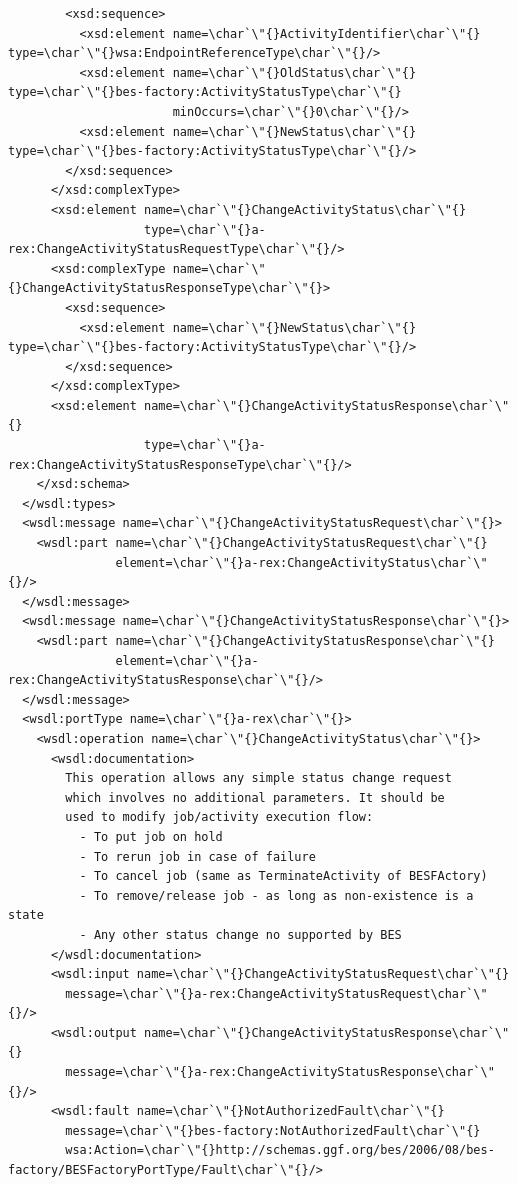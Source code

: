 \documentclass{article}                            %
\begin{document}
\begin{footnotesize}
\begin{verbatim}
        <xsd:sequence>
          <xsd:element name=\char`\"{}ActivityIdentifier\char`\"{} type=\char`\"{}wsa:EndpointReferenceType\char`\"{}/>
          <xsd:element name=\char`\"{}OldStatus\char`\"{} type=\char`\"{}bes-factory:ActivityStatusType\char`\"{}
                       minOccurs=\char`\"{}0\char`\"{}/>
          <xsd:element name=\char`\"{}NewStatus\char`\"{} type=\char`\"{}bes-factory:ActivityStatusType\char`\"{}/>
        </xsd:sequence>
      </xsd:complexType>
      <xsd:element name=\char`\"{}ChangeActivityStatus\char`\"{}
                   type=\char`\"{}a-rex:ChangeActivityStatusRequestType\char`\"{}/>
      <xsd:complexType name=\char`\"{}ChangeActivityStatusResponseType\char`\"{}>
        <xsd:sequence>
          <xsd:element name=\char`\"{}NewStatus\char`\"{} type=\char`\"{}bes-factory:ActivityStatusType\char`\"{}/>
        </xsd:sequence>
      </xsd:complexType>
      <xsd:element name=\char`\"{}ChangeActivityStatusResponse\char`\"{}
                   type=\char`\"{}a-rex:ChangeActivityStatusResponseType\char`\"{}/>
    </xsd:schema>
  </wsdl:types>
  <wsdl:message name=\char`\"{}ChangeActivityStatusRequest\char`\"{}>
    <wsdl:part name=\char`\"{}ChangeActivityStatusRequest\char`\"{}
               element=\char`\"{}a-rex:ChangeActivityStatus\char`\"{}/>
  </wsdl:message>
  <wsdl:message name=\char`\"{}ChangeActivityStatusResponse\char`\"{}>
    <wsdl:part name=\char`\"{}ChangeActivityStatusResponse\char`\"{}
               element=\char`\"{}a-rex:ChangeActivityStatusResponse\char`\"{}/>
  </wsdl:message>
  <wsdl:portType name=\char`\"{}a-rex\char`\"{}>
    <wsdl:operation name=\char`\"{}ChangeActivityStatus\char`\"{}>
      <wsdl:documentation>
        This operation allows any simple status change request
        which involves no additional parameters. It should be
        used to modify job/activity execution flow:
          - To put job on hold
          - To rerun job in case of failure
          - To cancel job (same as TerminateActivity of BESFActory)
          - To remove/release job - as long as non-existence is a state
          - Any other status change no supported by BES
      </wsdl:documentation>
      <wsdl:input name=\char`\"{}ChangeActivityStatusRequest\char`\"{}
        message=\char`\"{}a-rex:ChangeActivityStatusRequest\char`\"{}/>
      <wsdl:output name=\char`\"{}ChangeActivityStatusResponse\char`\"{}
        message=\char`\"{}a-rex:ChangeActivityStatusResponse\char`\"{}/>
      <wsdl:fault name=\char`\"{}NotAuthorizedFault\char`\"{}
        message=\char`\"{}bes-factory:NotAuthorizedFault\char`\"{}
        wsa:Action=\char`\"{}http://schemas.ggf.org/bes/2006/08/bes-factory/BESFactoryPortType/Fault\char`\"{}/>

\end{verbatim}
\end{footnotesize}
\end{document}

